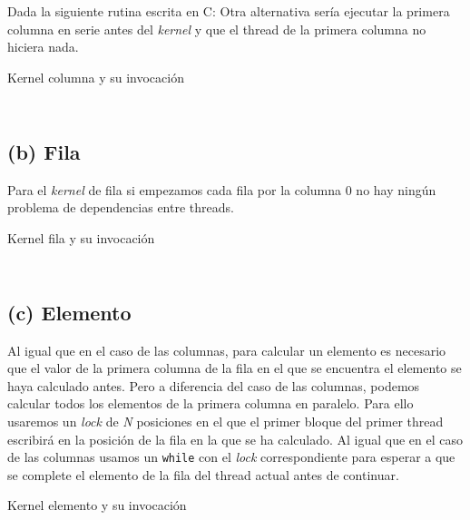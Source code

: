 \begin{pregunta}{Dada la siguiente rutina escrita en C:}
Otra alternativa sería ejecutar la primera columna en serie antes del \emph{kernel} y que el
thread de la primera columna no hiciera nada.

\begin{listing}[H]
    \caption{Kernel columna y su invocación}
    \inputminted[firstline=17,lastline=33]{cuda}{code/main.cu}
    \vspace{-2em}
    \inputminted[firstline=120,lastline=127,autogobble]{cuda}{code/main.cu}
    \label{lst:kernel-columna}
\end{listing}

\pagebreak
\subsection*{(b) Fila}

Para el \emph{kernel} de fila si empezamos cada fila por la columna 0 no hay ningún
problema de dependencias entre threads.

\begin{listing}[H]
    \caption{Kernel fila y su invocación}
    \inputminted[firstline=35,lastline=41]{cuda}{code/main.cu}
    \vspace{-2em}
    \inputminted[firstline=114,lastline=117,autogobble]{cuda}{code/main.cu}
    \label{lst:kernel-fila}
\end{listing}

\pagebreak
\subsection*{(c) Elemento}

Al igual que en el caso de las columnas, para calcular un elemento es necesario que
el valor de la primera columna de la fila en el que se encuentra el elemento se haya
calculado antes. Pero a diferencia del caso de las columnas, podemos calcular todos los
elementos de la primera columna en paralelo. Para ello usaremos un \emph{lock} de
\emph{N} posiciones en el que el primer bloque del primer thread escribirá en la posición
de la fila en la que se ha calculado. Al igual que en el caso de las columnas usamos un
\texttt{while} con el \emph{lock} correspondiente para esperar a que
se complete el elemento de la fila del thread actual antes de continuar.

\begin{listing}[H]
    \caption{Kernel elemento y su invocación}
    \inputminted[firstline=43,lastline=57]{cuda}{code/main.cu}
    \vspace{-2em}
    \inputminted[firstline=130,lastline=137,autogobble]{cuda}{code/main.cu}
    \label{lst:kernel-elemento}
\end{listing}

\nocite{noauthor_cuda_nodate}

\end{pregunta}

